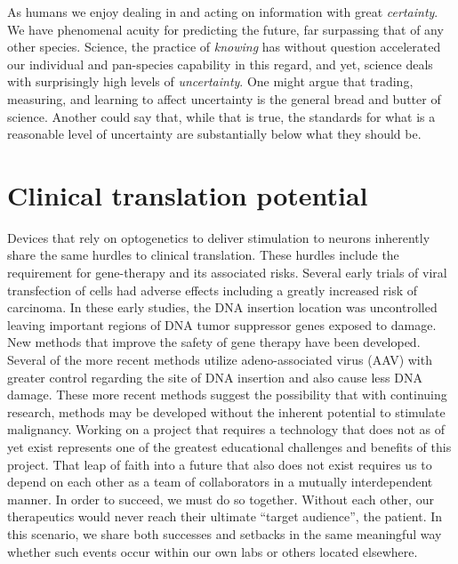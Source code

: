 \documentclass[../main.tex]{subfiles}
\begin{document}
As humans we enjoy dealing in and acting on information with great
\emph{certainty}. We have phenomenal acuity for predicting the future,
far surpassing that of any other species. Science, the practice of
\emph{knowing} has without question accelerated our individual and
pan-species capability in this regard, and yet, science deals with
surprisingly high levels of \emph{uncertainty}. One might argue that
trading, measuring, and learning to affect uncertainty is the general
bread and butter of science. Another could say that, while that is true,
the standards for what is a reasonable level of uncertainty are
substantially below what they should be.



\section{Clinical translation potential}
\label{sec:clinical-translation-potential}

Devices that rely on optogenetics to deliver stimulation to neurons inherently share the same hurdles to clinical translation.
These hurdles include the requirement for gene-therapy and its associated risks.
Several early trials of viral transfection of cells had adverse effects including a greatly increased risk of carcinoma.
In these early studies, the DNA insertion location was uncontrolled leaving important regions of DNA tumor suppressor genes exposed to damage.
New methods that improve the safety of gene therapy have been developed.
Several of the more recent methods utilize adeno-associated virus (AAV) with greater control regarding the site of DNA insertion and also cause less DNA damage.
These more recent methods suggest the possibility that with continuing research, methods may be developed without the inherent potential to stimulate malignancy.
Working on a project that requires a technology that does not as of yet exist represents one of the greatest educational challenges and benefits of this project.
That leap of faith into a future that also does not exist requires us to depend on each other as a team of collaborators in a mutually interdependent manner.
In order to succeed, we must do so together.
Without each other, our therapeutics would never reach their ultimate “target audience”, the patient.
In this scenario, we share both successes and setbacks in the same meaningful way whether such events occur within our own labs or others located elsewhere.
\end{document}
